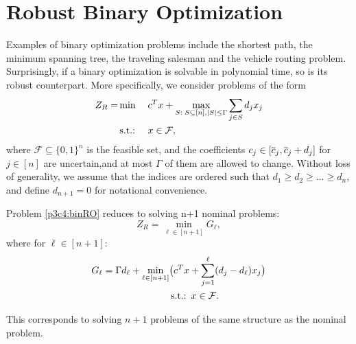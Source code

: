 \section{Robust Binary Optimization}

Examples of binary optimization problems include the shortest path, the minimum spanning tree, the traveling salesman and the vehicle routing problem. Surprisingly, if a binary optimization is solvable in polynomial time, so is its robust counterpart. More specifically, we consider problems of the form
\begin{align}\label{p3c4:binRO}
Z_R = & \min  && c^Tx + \max\limits_{S:\;S\subseteq[n],\vert S\vert\leq\Gamma} \sum\limits_{j\in S}d_jx_j \\
& \mathop{\text{s.t.:~}} && x\in\mathcal{F},
\end{align}
where $\mathcal{F}\subseteq \{0,1\}^n$ is the feasible set, and the coefficients $c_j\in[\overline{ c }_j,\overline{ c }_j+d_j]$ for $j\in[n]$ are uncertain,and at most $\Gamma$ of them are allowed to change. Without loss of generality, we assume that the indices are ordered such that $d_1\geq d_2\geq \dots\geq d_n$, and define $d_{n+1} = 0$ for notational convenience.

\begin{theorem}\label{p3c4:thm:n+1prob}
Problem \eqref{p3c4:binRO} reduces to solving n+1 nominal problems:
\[Z_R = \min\limits_{\ell\in [n+1]} G_\ell ,\]
where for $\ell \in [n+1]$:
\begin{align}\label{p3c4:G_l}
G_\ell = \Gamma d_\ell +\min\limits_{\ell\in [n+1]} & \big( c^Tx+\sum\limits_{j=1}^\ell (d_j-d_\ell)x_j\big) \\
& \mathop{\text{s.t.:~}} x\in\mathcal{F}.
\end{align}
\end{theorem}
This corresponds to solving $n+1$ problems of the same structure as the nominal problem.

